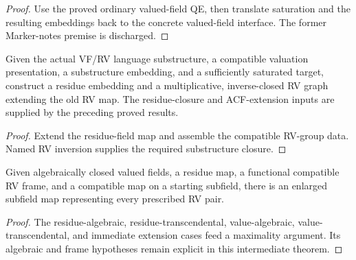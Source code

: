 \begin{proof}


\leanok

Use the proved ordinary valued-field QE, then translate saturation and the
resulting embeddings back to the concrete valued-field interface. The former
Marker-notes premise is discharged.

\end{proof}

\begin{theorem}

\label{frame}


\leanok

Given the actual VF/RV language substructure, a compatible valuation
presentation, a substructure embedding, and a sufficiently saturated target,
construct a residue embedding and a multiplicative, inverse-closed RV graph
extending the old RV map. The residue-closure and ACF-extension inputs are
supplied by the preceding proved results.

\end{theorem}

\begin{proof}


\leanok

Extend the residue-field map and assemble the compatible RV-group data.
Named RV inversion supplies the required substructure closure.

\end{proof}

\begin{theorem}

\label{maximal}


\leanok

Given algebraically closed valued fields, a residue map, a functional
compatible RV frame, and a compatible map on a starting subfield, there is
an enlarged subfield map representing every prescribed RV pair.

\end{theorem}

\begin{proof}

\leanok

The residue-algebraic, residue-transcendental, value-algebraic,
value-transcendental, and immediate extension cases feed a maximality
argument. Its algebraic and frame hypotheses remain explicit in this
intermediate theorem.

\end{proof}

